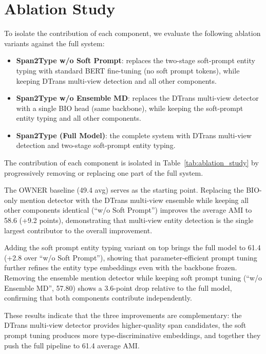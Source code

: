 \documentclass[14pt]{extreport}
\begin{document}
\FloatBarrier

\section{Ablation Study}

To isolate the contribution of each component, we evaluate the following ablation variants against the full system:

\begin{itemize}
    \item \textbf{Span2Type w/o Soft Prompt}: replaces the two-stage soft-prompt entity typing with standard BERT fine-tuning (no soft prompt tokens), while keeping DTrans multi-view detection and all other components.
    \item \textbf{Span2Type w/o Ensemble MD}: replaces the DTrans multi-view detector with a single BIO head (same backbone), while keeping the soft-prompt entity typing and all other components.
    \item \textbf{Span2Type (Full Model)}: the complete system with DTrans multi-view detection and two-stage soft-prompt entity typing.
\end{itemize}

The contribution of each component is isolated in Table~\ref{tab:ablation_study} by progressively removing or replacing one part of the full system.

\FloatBarrier



\FloatBarrier

The OWNER baseline (49.4 avg) serves as the starting point. Replacing the BIO-only mention detector with the DTrans multi-view ensemble while keeping all other components identical (``w/o Soft Prompt'') improves the average AMI to 58.6 (+9.2 points), demonstrating that multi-view entity detection is the single largest contributor to the overall improvement.

Adding the soft prompt entity typing variant on top brings the full model to 61.4 (+2.8 over ``w/o Soft Prompt''), showing that parameter-efficient prompt tuning further refines the entity type embeddings even with the backbone frozen. Removing the ensemble mention detector while keeping soft prompt tuning (``w/o Ensemble MD'', 57.80) shows a 3.6-point drop relative to the full model, confirming that both components contribute independently.

These results indicate that the three improvements are complementary: the DTrans multi-view detector provides higher-quality span candidates, the soft prompt tuning produces more type-discriminative embeddings, and together they push the full pipeline to 61.4 average AMI.
\end{document}
